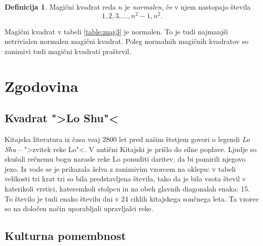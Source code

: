 \documentclass[a4paper,12pt]{article}
\theoremstyle{definition}
\newtheorem{definicija}{Definicija}
\theoremstyle{plain}
\begin{document}

\begin{definicija}
   Magični kvadrat reda \(n\) je \emph{normalen}, če v njem nastopajo števila
   \begin{equation}
      \label{eq:numbers}
      1, 2, 3, \ldots, n^2-1, n^2.
   \end{equation}
\end{definicija}

Magični kvadrat v tabeli \ref{table:mag3} je normalen.
To je tudi najmanjši netrivialen normalen magični kvadrat.
Poleg normalnih magičnih kvadratov so zanimivi tudi magični kvadrati praštevil. %


\section{Zgodovina}

\subsection{Kvadrat ">Lo Shu"<}

Kitajska literatura iz časa vsaj 2800 let pred našim štetjem govori o legendi
\emph{Lo Shu} -- ">zvitek reke Lo"<. V antični Kitajski je prišlo do
silne poplave. Ljudje so skušali rečnemu bogu narasle reke Lo ponuditi daritev,
da bi pomirili njegovo jezo. Iz vode se je prikazala želva z zanimivim vzorcem
na oklepu: v tabeli velikosti tri krat tri so bila predstavljena števila, tako
da je bila vsota števil v katerikoli vrstici, kateremkoli stolpcu in na obeh
glavnih diagonalah enaka: 15. To število je tudi enako številu dni v 24 ciklih
kitajskega sončnega leta. Ta vzorec so na določen način uporabljali upravljalci
reke.


\subsection{Kulturna pomembnost}
\end{document}
